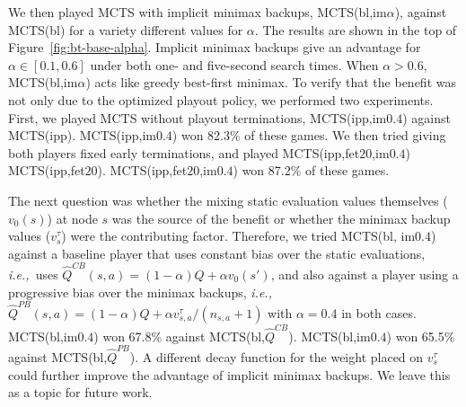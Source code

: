 \documentclass{article}
\newcommand{\hQ}{\hat{Q}}
\newcommand{\ie}{{\it i.e.,}~}
\newcounter{mlNoteCounter}
\newcommand{\mlnote}[1]{{\scriptsize \color{darkgreen} $\blacksquare$ \refstepcounter{mlNoteCounter}\textsf{[ML]$_{\arabic{mlNoteCounter}}$:{#1}}}}
\begin{document}
We then played MCTS with implicit minimax backups, MCTS(bl,im$\alpha$), against MCTS(bl) for a 
variety different values for $\alpha$. The results are shown in the top of Figure~\ref{fig:bt-base-alpha}.
Implicit minimax backups give an advantage for $\alpha \in [0.1,0.6]$ under both one- and five-second 
search times. 
When $\alpha > 0.6$, MCTS(bl,im$\alpha$) acts like greedy best-first minimax.
To verify that the benefit was not only due to the optimized playout policy, we performed two experiments. 
First, we played MCTS without playout terminations, MCTS(ipp,im$0.4$) against MCTS(ipp). 
MCTS(ipp,im$0.4$) won 82.3\% of these games. 
We then tried giving both players fixed early terminations, and played MCTS(ipp,fet$20$,im$0.4$) 
MCTS(ipp,fet$20$). MCTS(ipp,fet$20$,im$0.4$) won 87.2\% of these games.

 
The next question was whether the mixing static evaluation values themselves ($v_0(s)$) at node $s$ 
was the source of the benefit or whether the minimax backup values ($v^{\tau}_s$) were the contributing factor.
Therefore, we tried MCTS(bl, im$0.4$) against a baseline player that uses constant bias over the static 
evaluations, \ie uses $\hQ^{CB}(s,a) = (1-\alpha)Q + \alpha v_0(s')$,
and also against a player using a progressive bias over the minimax backups, \ie 
$\hQ^{PB}(s,a) = (1-\alpha)Q + \alpha v^{\tau}_{s,a}/(n_{s,a} + 1)$
with $\alpha = 0.4$ in both cases.
MCTS(bl,im$0.4$) won 67.8\% against MCTS(bl,$\hQ^{CB}$). 
MCTS(bl,im$0.4$) won 65.5\% against MCTS(bl,$\hQ^{PB}$). 
A different decay function for the weight placed on $v^{\tau}_s$ could further improve 
the advantage of implicit minimax backups. We leave this as a topic for future work. 
\end{document}
